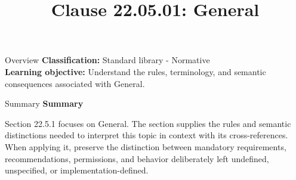 \documentclass[10pt,letterpaper]{article}
\title{Clause 22.05.01: General}
\author{}
\date{}
\begin{document}
\maketitle
\begin{CornellOverviewBox}{Overview}
\textbf{Classification:} Standard library - Normative\\[2pt]
\textbf{Learning objective:} Understand the rules, terminology, and semantic consequences associated with General.
\end{CornellOverviewBox}\begin{CornellSummaryBox}{Summary}
{\sffamily\bfseries\color{Accent} Summary}\par\vspace{3pt}Section 22.5.1 focuses on General. The section supplies the rules and semantic distinctions needed to interpret this topic in context with its cross-references. When applying it, preserve the distinction between mandatory requirements, recommendations, permissions, and behavior deliberately left undefined, unspecified, or implementation-defined.
\end{CornellSummaryBox}
\end{document}
